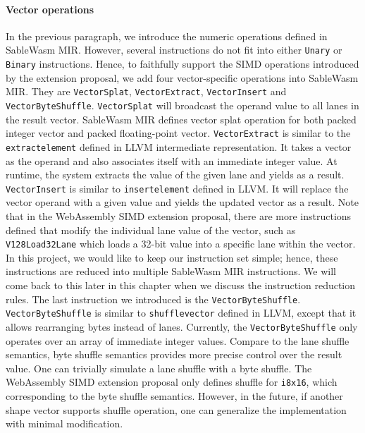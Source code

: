 \paragraph{Vector operations}
In the previous paragraph, we introduce the numeric operations defined in
SableWasm MIR. However, several instructions do not fit into either
\texttt{Unary} or \texttt{Binary} instructions. Hence, to faithfully support the
SIMD operations introduced by the extension proposal, we add four
vector-specific operations into SableWasm MIR. They are \texttt{VectorSplat},
\texttt{VectorExtract}, \texttt{VectorInsert} and \texttt{VectorByteShuffle}.
\texttt{VectorSplat} will broadcast the operand value to all lanes in the result
vector. SableWasm MIR defines vector splat operation for both packed integer
vector and packed floating-point vector. \texttt{VectorExtract} is similar to
the \texttt{extractelement} defined in LLVM intermediate representation. It
takes a vector as the operand and also associates itself with an immediate
integer value. At runtime, the system extracts the value of the given lane and
yields as a result. \texttt{VectorInsert} is similar to \texttt{insertelement}
defined in LLVM. It will replace the vector operand with a given value and
yields the updated vector as a result. Note that in the WebAssembly SIMD
extension proposal, there are more instructions defined that modify the
individual lane value of the vector, such as \texttt{V128Load32Lane} which
loads a 32-bit value into a specific lane within the vector. In this project,
we would like to keep our instruction set simple; hence, these instructions are
reduced into multiple SableWasm MIR instructions. We will come back to this
later in this chapter when we discuss the instruction reduction rules. The last
instruction we introduced is the \texttt{VectorByteShuffle}.
\texttt{VectorByteShuffle} is similar to \texttt{shufflevector} defined in LLVM,
except that it allows rearranging bytes instead of lanes. Currently, the
\texttt{VectorByteShuffle} only operates over an array of immediate integer
values. Compare to the lane shuffle semantics, byte shuffle semantics provides
more precise control over the result value. One can trivially simulate a lane
shuffle with a byte shuffle. The WebAssembly SIMD extension proposal only
defines shuffle for \texttt{i8x16}, which corresponding to the byte shuffle
semantics. However, in the future, if another shape vector supports shuffle
operation, one can generalize the implementation with minimal modification.

